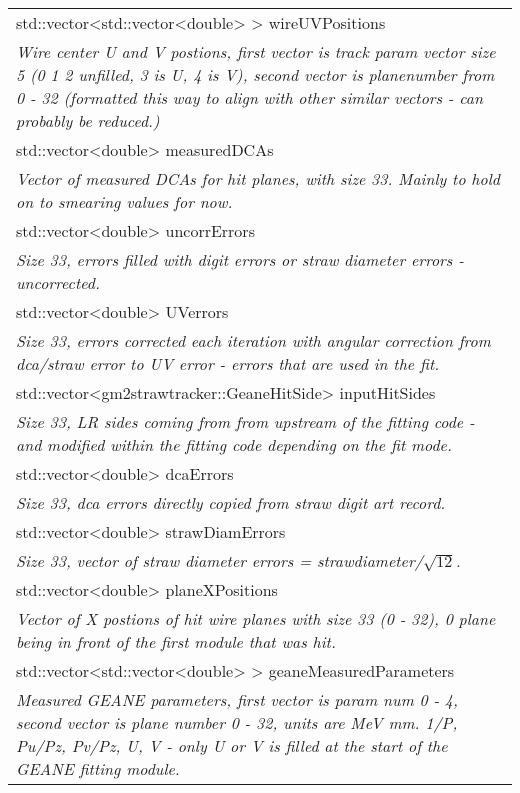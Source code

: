 \begin{longtable}{|p{16cm}|}
std::vector\textless{}std::vector\textless{}double\textgreater{} \textgreater{} wireUVPositions \\
\textit{Wire center U and V postions, first vector is track param vector size 5 (0 1 2 unfilled, 3 is U, 4 is V), second vector is planenumber from 0 - 32  (formatted this way to align with other similar vectors - can probably be reduced.)} \\ \hline

std::vector\textless{}double\textgreater{} measuredDCAs \\
\textit{Vector of measured DCAs for hit planes, with size 33. Mainly to hold on to smearing values for now.} \\ \hline

std::vector\textless{}double\textgreater{} uncorrErrors \\
\textit{Size 33, errors filled with digit errors or straw diameter errors - uncorrected.} \\ \hline

std::vector\textless{}double\textgreater{} UVerrors \\
\textit{Size 33, errors corrected each iteration with angular correction from dca/straw error to UV error - errors that are used in the fit.} \\ \hline

std::vector\textless{}gm2strawtracker::GeaneHitSide\textgreater{} inputHitSides \\
\textit{Size 33, LR sides coming from from upstream of the fitting code - and modified within the fitting code depending on the fit mode.}  \\ \hline

std::vector\textless{}double\textgreater{} dcaErrors \\
\textit{Size 33, dca errors directly copied from straw digit art record.} \\ \hline

std::vector\textless{}double\textgreater{} strawDiamErrors \\
\textit{Size 33, vector of straw diameter errors = strawdiameter/$\sqrt{12}$.} \\ \hline

std::vector\textless{}double\textgreater{} planeXPositions \\
\textit{Vector of X postions of hit wire planes with size 33 (0 - 32), 0 plane being in front of the first module that was hit.} \\ \hline

std::vector\textless{}std::vector\textless{}double\textgreater{} \textgreater{} geaneMeasuredParameters \\
\textit{Measured GEANE parameters, first vector is param num 0 - 4, second vector is plane number 0 - 32, units are MeV mm. 1/P, Pu/Pz, Pv/Pz, U, V - only U or V is filled at the start of the GEANE fitting module.} \\ \hline


\end{longtable}
